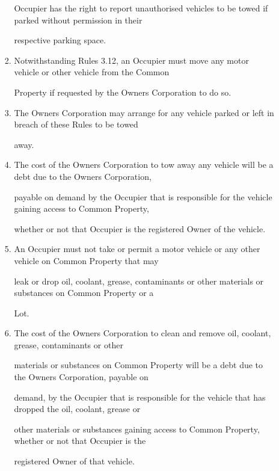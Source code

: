 \documentclass{article}
\begin{document}
\begin{enumerate}[label=\arabic*.]
\begin{enumerate}[label=\arabic{enumi}.\arabic*.]
\begin{enumerate}[label=(\arabic*)]
{\fontsize{10.02}{1}Occupier has the right to report unauthorised vehicles to be towed if parked without permission in their }

{\fontsize{10.02}{1}respective parking space. }

\item {\fontsize{9.962}{1} Notwithstanding Rules 3.12, an Occupier must move any motor vehicle or other vehicle from the Common }

{\fontsize{10.02}{1}Property if requested by the Owners Corporation to do so. }

\item {\fontsize{9.962}{1} The Owners Corporation may arrange for any vehicle parked or left in breach of these Rules to be towed }

{\fontsize{10.02}{1}away. }

\newpage

\item {\fontsize{9.962}{1} The cost of the Owners Corporation to tow away any vehicle will be a debt due to the Owners Corporation, }

{\fontsize{10.02}{1}payable on demand by the Occupier that is responsible for the vehicle gaining access to Common Property, }

{\fontsize{10.02}{1}whether or not that Occupier is the registered Owner of the vehicle. }

\item {\fontsize{9.962}{1} An Occupier must not take or permit a motor vehicle or any other vehicle on Common Property that may }

{\fontsize{10.02}{1}leak or drop oil, coolant, grease, contaminants or other materials or substances on Common Property or a }

{\fontsize{10.02}{1}Lot. }

\item {\fontsize{9.962}{1} The cost of the Owners Corporation to clean and remove oil, coolant, grease, contaminants or other }

{\fontsize{10.02}{1}materials or substances on Common Property will be a debt due to the Owners Corporation, payable on }

{\fontsize{10.02}{1}demand, by the Occupier that is responsible for the vehicle that has dropped the oil, coolant, grease or }

{\fontsize{10.02}{1}other materials or substances gaining access to Common Property, whether or not that Occupier is the }

{\fontsize{10.02}{1}registered Owner of that vehicle. }


\end{enumerate}
\end{enumerate}
\end{enumerate}
\end{document}
